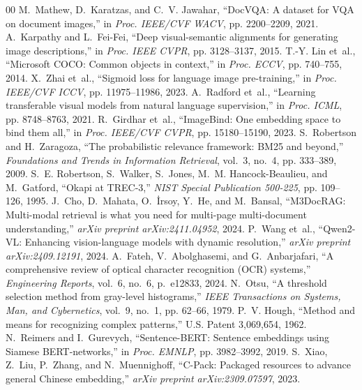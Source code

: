 \begin{thebibliography}{00}
M.~Mathew, D.~Karatzas, and C.~V. Jawahar, ``DocVQA: A dataset for VQA on document images,'' in \emph{Proc. IEEE/CVF WACV}, pp. 2200--2209, 2021.
A.~Karpathy and L.~Fei-Fei, ``Deep visual-semantic alignments for generating image descriptions,'' in \emph{Proc. IEEE CVPR}, pp. 3128--3137, 2015.
T.-Y. Lin et~al., ``Microsoft COCO: Common objects in context,'' in \emph{Proc. ECCV}, pp. 740--755, 2014.
X.~Zhai et~al., ``Sigmoid loss for language image pre-training,'' in \emph{Proc. IEEE/CVF ICCV}, pp. 11975--11986, 2023.
A.~Radford et~al., ``Learning transferable visual models from natural language supervision,'' in \emph{Proc. ICML}, pp. 8748--8763, 2021.
R.~Girdhar et~al., ``ImageBind: One embedding space to bind them all,'' in \emph{Proc. IEEE/CVF CVPR}, pp. 15180--15190, 2023.
S.~Robertson and H.~Zaragoza, ``The probabilistic relevance framework: BM25 and beyond,'' \emph{Foundations and Trends in Information Retrieval}, vol.~3, no.~4, pp. 333--389, 2009.
S.~E. Robertson, S.~Walker, S.~Jones, M.~M. Hancock-Beaulieu, and M.~Gatford, ``Okapi at TREC-3,'' \emph{NIST Special Publication 500-225}, pp. 109--126, 1995.
J.~Cho, D.~Mahata, O.~{\.I}rsoy, Y.~He, and M.~Bansal, ``M3DocRAG: Multi-modal retrieval is what you need for multi-page multi-document understanding,'' \emph{arXiv preprint arXiv:2411.04952}, 2024.
P.~Wang et~al., ``Qwen2-VL: Enhancing vision-language models with dynamic resolution,'' \emph{arXiv preprint arXiv:2409.12191}, 2024.
A.~Fateh, V.~Abolghasemi, and G.~Anbarjafari, ``A comprehensive review of optical character recognition (OCR) systems,'' \emph{Engineering Reports}, vol.~6, no.~6, p.~e12833, 2024.
N.~Otsu, ``A threshold selection method from gray-level histograms,'' \emph{IEEE Transactions on Systems, Man, and Cybernetics}, vol.~9, no.~1, pp. 62--66, 1979.
P.~V. Hough, ``Method and means for recognizing complex patterns,'' U.S. Patent 3,069,654, 1962.
N.~Reimers and I.~Gurevych, ``Sentence-BERT: Sentence embeddings using Siamese BERT-networks,'' in \emph{Proc. EMNLP}, pp. 3982--3992, 2019.
S.~Xiao, Z.~Liu, P.~Zhang, and N.~Muennighoff, ``C-Pack: Packaged resources to advance general Chinese embedding,'' \emph{arXiv preprint arXiv:2309.07597}, 2023.

\end{thebibliography}
